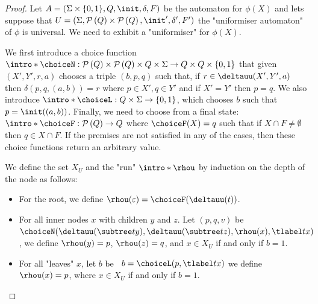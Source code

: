 \documentclass[twoside]{article}
\begin{document}
\begin{proof}
	Let $A =  (\Sigma \times \{0,1\}, Q, \init, \delta, F)$ be the automaton for $\phi(X)$ and lets suppose that
	$U = (\Sigma, \parts Q \times \parts Q,\init', \delta', F')$ the "uniformiser automaton" of $\phi$ is universal.
	We need to exhibit a "uniformiser" for $\phi(X)$.

	We first introduce a choice function $\intro*\choiceN : \parts Q \times \parts Q \times Q \times \Sigma \to Q \times Q \times \set{0,1}$
	that given $(X',Y',r,a)$ chooses a triple $(b,p,q)$ such that, if $r \in \deltauu(X',Y', a)$ then $\delta(p,q,(a,b)) = r$ where $p \in X', q \in Y'$
	and if $X' = Y'$ then $p = q$.
	We also introduce $\intro* \choiceL : Q \times \Sigma \to \set{0,1} $, which chooses
	$b$ such that $p = \init((a,b))$.
	Finally, we need to choose from a final state: $\intro* \choiceF : \parts Q \to  Q$ where
	$\choiceF (X) = q$ such that if $X \cap F \neq \emptyset$ then $q \in X \cap F$. If the premises are not satisfied in any of the cases, then
	these choice functions return an arbitrary value.

	We define the set $X_U$ and the "run" $\intro*\rhou$  by induction on the depth of the node as follows:
	\begin{itemize}
		\item For the root, we define $\rhou(\varepsilon) = \choiceF(\deltauu(t))$.
		\item For all inner nodes $x$ with children $y$ and $z$. Let $(p,q,v)$ be~$\choiceN(\deltauu(\subtree t y), \deltauu(\subtree t z), \rhou(x), \tlabel t x)$, we define
		      $\rhou(y)=p$, $\rhou(z)=q$, and $x \in X_U$ if and only if $b = 1$.
		\item For all "leaves" $x$, let $b$ be ~$b = \choiceL(p, \tlabel t x)$ we define $\rhou (x) = p$, where $x \in X_U$ if and only if $b = 1$.
	\end{itemize}


\end{proof}
\end{document}
